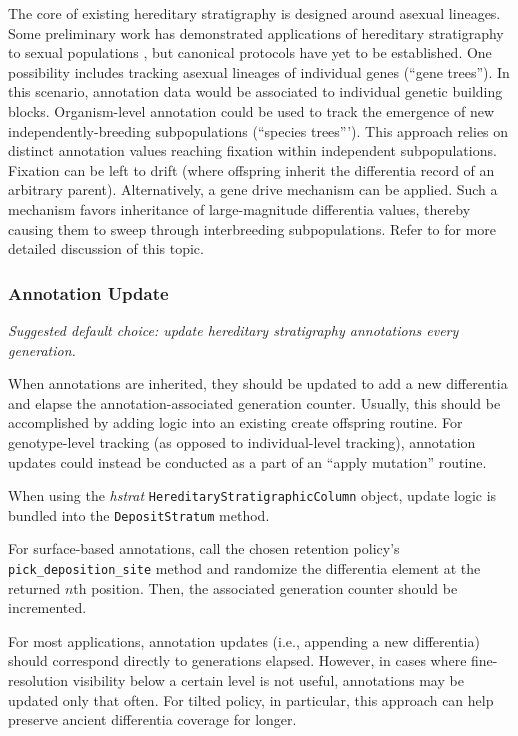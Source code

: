 The core of existing hereditary stratigraphy is designed around asexual lineages.
Some preliminary work has demonstrated applications of hereditary stratigraphy to sexual populations \citep{moreno2024methods}, but canonical protocols have yet to be established.
One possibility includes tracking asexual lineages of individual genes (``gene trees'').
In this scenario, annotation data would be associated to individual genetic building blocks.
Organism-level annotation could be used to track the emergence of new independently-breeding subpopulations (``species trees''').
This approach relies on distinct annotation values reaching fixation within independent subpopulations.
Fixation can be left to drift (where offspring inherit the differentia record of an arbitrary parent).
Alternatively, a gene drive mechanism can be applied.
Such a mechanism favors inheritance of large-magnitude differentia values, thereby causing them to sweep through interbreeding subpopulations.
Refer to \citet{moreno2024methods} for more detailed discussion of this topic.

\subsubsection{Annotation Update}
\textit{Suggested default choice: update hereditary stratigraphy annotations every generation.}

When annotations are inherited, they should be updated to add a new differentia and elapse the annotation-associated generation counter.
Usually, this should be accomplished by adding logic into an existing create offspring routine.
For genotype-level tracking (as opposed to individual-level tracking), annotation updates could instead be conducted as a part of an ``apply mutation'' routine.

When using the \textit{hstrat} \texttt{HereditaryStratigraphicColumn} object, update logic is bundled into the \texttt{DepositStratum} method.

For surface-based annotations, call the chosen retention policy's \texttt{pick\_deposition\_site} method and randomize the differentia element at the returned $n$th position.
Then, the associated generation counter should be incremented.

For most applications, annotation updates (i.e., appending a new differentia) should correspond directly to generations elapsed.
However, in cases where fine-resolution visibility below a certain level is not useful, annotations may be updated only that often.
For tilted policy, in particular, this approach can help preserve ancient differentia coverage for longer.


